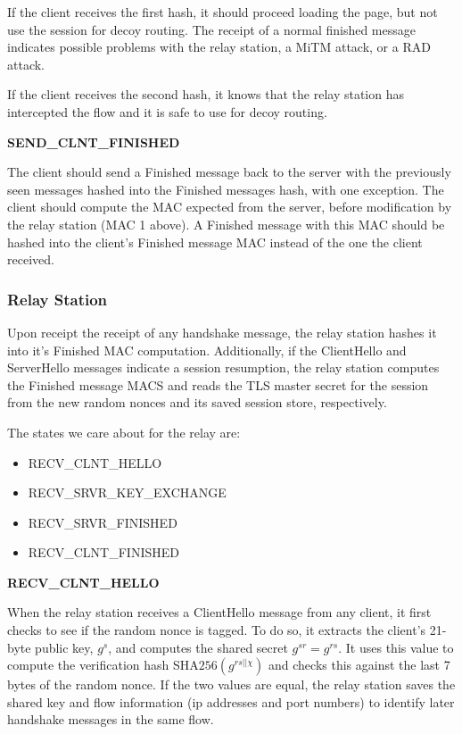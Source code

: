 \documentclass[11pt]{article}
\theoremstyle{definittion}
\begin{document}
If the client receives the first hash, it should proceed loading the page, but not use the session for decoy routing. The receipt of a normal finished message indicates possible problems with the relay station, a MiTM attack, or a RAD attack.

If the client receives the second hash, it knows that the relay station has intercepted the flow and it is safe to use for decoy routing.

\textbf{SEND\_CLNT\_FINISHED}

The client should send a Finished message back to the server with the previously seen messages hashed into the Finished messages hash, with one exception. The client should compute the MAC expected from the server, before modification by the relay station (MAC 1 above). A Finished message with this MAC should be hashed into the client's Finished message MAC instead of the one the client received.

\subsubsection{Relay Station}

Upon receipt the receipt of any handshake message, the relay station hashes it into it's Finished MAC computation. Additionally, if the ClientHello and ServerHello messages indicate a session resumption, the relay station computes the Finished message MACS and reads the TLS master secret for the session from the new random nonces and its saved session store, respectively.

The states we care about for the relay are:
\begin{itemize}
\item RECV\_CLNT\_HELLO
\item RECV\_SRVR\_KEY\_EXCHANGE
\item RECV\_SRVR\_FINISHED
\item RECV\_CLNT\_FINISHED
\end{itemize}


\textbf{RECV\_CLNT\_HELLO}

When the relay station receives a ClientHello message from any client, it first checks to see if the random nonce is tagged. To do so, it extracts the client's 21-byte public key, $g^s$, and computes the shared secret $g^{sr} = g^{rs}$. It uses this value to compute the verification hash SHA$256(g^{rs||\chi})$ and checks this against the last 7 bytes of the random nonce. If the two values are equal, the relay station saves the shared key and flow information (ip addresses and port numbers) to identify later handshake messages in the same flow.
\end{document}
